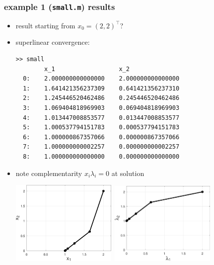 \documentclass[10pt,hyperref]{beamer}
\begin{document}
\begin{frame}[fragile]
\frametitle{example 1 (\texttt{small.m}) results}

\begin{itemize}
\item result starting from $x_0=(2,2)^\top$?
\item superlinear convergence:
\begin{Verbatim}[fontsize=\scriptsize]
>> small
        x_1                  x_2
  0:    2.000000000000000    2.000000000000000
  1:    1.641421356237309    0.641421356237310
  2:    1.245446520462486    0.245446520462486
  3:    1.069404818969903    0.069404818969903
  4:    1.013447008853577    0.013447008853577
  5:    1.000537794151783    0.000537794151783
  6:    1.000000867357066    0.000000867357066
  7:    1.000000000002257    0.000000000002257
  8:    1.000000000000000    0.000000000000000
\end{Verbatim}

\item note complementarity $x_i\lambda_i=0$ at solution

\medskip
\hfill
\mbox{\includegraphics[width=0.4\textwidth]{figs/small.pdf} \qquad \includegraphics[width=0.4\textwidth]{figs/smalldual.pdf}}
\end{itemize}
\end{frame}
\end{document}
